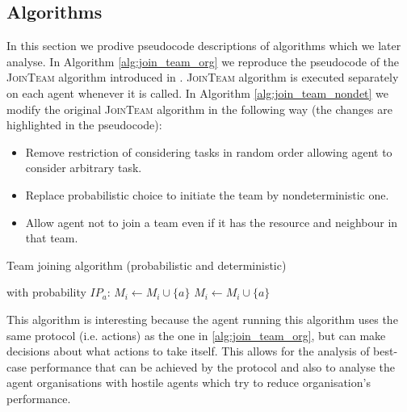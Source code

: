 \documentclass{llncs}
\begin{document}
\subsection{Algorithms}

In this section we prodive pseudocode descriptions of algorithms which we later analyse. In Algorithm \ref{alg:join_team_org} we reproduce the pseudocode of the \textsc{JoinTeam} algorithm introduced in \cite{gaston2005agent}. \textsc{JoinTeam} algorithm is executed separately on each agent whenever it is called.  In Algorithm \ref{alg:join_team_nondet} we modify the original \textsc{JoinTeam} algorithm in the following way (the changes are highlighted in the pseudocode):
\begin{itemize}
 \item Remove restriction of considering tasks in random order allowing agent to consider arbitrary task.
 \item Replace probabilistic choice to initiate the team by nondeterministic one.
 \item Allow agent not to join a team even if it has the resource and neighbour in that team.
\end{itemize}



\begin{algorithm}[H]
\caption{Team joining algorithm (probabilistic and deterministic)}
\label{alg:join_team_org}
\begin{scriptsize}
\begin{algorithmic}
     
       
	 
	  \State with probability $IP_a$: $M_i \leftarrow M_i \cup \{a\}$ 
	\EndIf
       
	 
	  \State $M_i \leftarrow M_i \cup \{a\}$ 
	\EndIf
      \EndIf
    \EndIf
  \EndFor
\EndProcedure
\end{algorithmic}
\end{scriptsize}
\end{algorithm}


This algorithm is interesting because the agent running this algorithm uses the same protocol (i.e. actions) as the one in \ref{alg:join_team_org}, but can make decisions about what actions to take itself. This allows for the analysis of best-case performance that can be achieved by the protocol and also to analyse the agent organisations with hostile agents which try to reduce organisation's performance.
\end{document}
